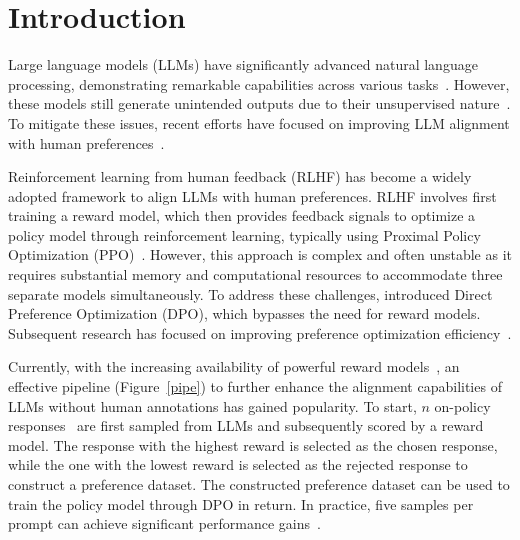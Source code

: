 \section{Introduction}
\label{sec:intro}

Large language models (LLMs) have significantly advanced natural language processing, demonstrating remarkable capabilities across various tasks~\cite{NEURIPS2020_1457c0d6, wei2022finetuned, bubeck2023sparksartificialgeneralintelligence}.  
However, these models still generate unintended outputs due to their unsupervised nature~\cite{bai2022traininghelpfulharmlessassistant, 10.1145/3531146.3533088}.  
To mitigate these issues, recent efforts have focused on improving LLM alignment with human preferences~\cite{NEURIPS2022_b1efde53, rafailov2023direct, pmlr-v238-gheshlaghi-azar24a, pmlr-v235-ethayarajh24a, meng2024simpo}. 

Reinforcement learning from human feedback (RLHF) has become a widely adopted framework to align LLMs with human preferences.  
RLHF involves first training a reward model, which then provides feedback signals to optimize a policy model through reinforcement learning, typically using Proximal Policy Optimization (PPO)~\cite{ahmadian-etal-2024-back}.  
However, this approach is complex and often unstable as it requires substantial memory and computational resources to accommodate three separate models simultaneously. 
To address these challenges, \citet{rafailov2023direct} introduced Direct Preference Optimization (DPO), which bypasses the need for reward models.
Subsequent research has focused on improving preference optimization efficiency~\cite{liu2024statistical, pmlr-v238-gheshlaghi-azar24a, pmlr-v235-ethayarajh24a, han2024fpogeneralizingpreferenceoptimization}.

Currently, with the increasing availability of powerful reward models~\cite{pmlr-v202-gao23h, wang-etal-2024-interpretable, liu2024skyworkrewardbagtricksreward}, an effective pipeline (Figure~\ref{pipe}) to further enhance the alignment capabilities of LLMs without human annotations has gained popularity.  
To start, $n$ on-policy responses~\cite{tajwar2024preferencefinetuningllmsleverage, guo2024directlanguagemodelalignment} are first sampled from LLMs and subsequently scored by a reward model.
The response with the highest reward is selected as the chosen response, while the one with the lowest reward is selected as the rejected response to construct a preference dataset.
The constructed preference dataset can be used to train the policy model through DPO in return. 
In practice, five samples per prompt can achieve significant performance gains~\cite{meng2024simpo}.



